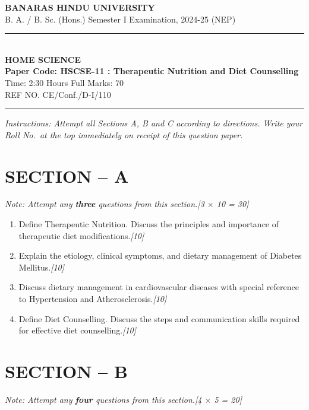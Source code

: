 \documentclass[11pt,a4paper]{article}
\newcommand{\pts}[1]{\hfill \textit{[#1]}}
\begin{document}
\begin{center}
  {\large\bfseries BANARAS HINDU UNIVERSITY}\\[2pt]
  {\normalsize B. A. / B. Sc. (Hons.) Semester I Examination, 2024-25 (NEP)}\\[6pt]
  \rule{0.8\linewidth}{0.5pt}\\[6pt]
  {\large\bfseries HOME SCIENCE}\\[4pt]
  {\large\bfseries Paper Code: HSCSE-11 : Therapeutic Nutrition and Diet Counselling}\\[4pt]
  {\normalsize Time: 2:30 Hours \hfill Full Marks: 70}\\[2pt]
  {\small REF NO. CE/Conf./D-I/110}
\end{center}
\rule{\linewidth}{0.4pt}
\smallskip

\noindent \textit{Instructions: Attempt all Sections A, B and C according to directions. Write your Roll No.\ at the top immediately on receipt of this question paper.}

\bigskip

\section*{SECTION -- A}
\noindent \textit{Note: Attempt any \textbf{three} questions from this section.}\pts{3 $\times$ 10 = 30}

\begin{enumerate}[label=\textbf{\arabic*.},leftmargin=*,itemsep=10pt]

  \item Define Therapeutic Nutrition. Discuss the principles and importance of therapeutic diet modifications.\pts{10}

  \item Explain the etiology, clinical symptoms, and dietary management of Diabetes Mellitus.\pts{10}

  \item Discuss dietary management in cardiovascular diseases with special reference to Hypertension and Atherosclerosis.\pts{10}

  \item Define Diet Counselling. Discuss the steps and communication skills required for effective diet counselling.\pts{10}

\end{enumerate}

\bigskip

\section*{SECTION -- B}
\noindent \textit{Note: Attempt any \textbf{four} questions from this section.}\pts{4 $\times$ 5 = 20}
\end{document}
